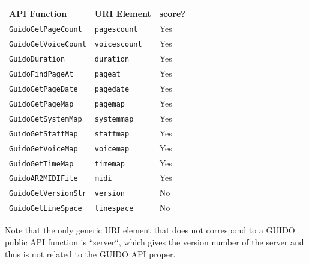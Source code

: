 \documentclass{article}
\begin{document}
\begin{table}
\begin{tabular}{|l|l|l|}\hline
API Function & URI Element & score? \\\hline
\verb=GuidoGetPageCount= & \verb=pagescount= & Yes \\\hline
\verb=GuidoGetVoiceCount= & \verb=voicescount= & Yes \\\hline
\verb=GuidoDuration= & \verb=duration= & Yes \\\hline
\verb=GuidoFindPageAt= & \verb=pageat= & Yes \\\hline
\verb=GuidoGetPageDate= & \verb=pagedate= & Yes \\\hline
\verb=GuidoGetPageMap= & \verb=pagemap= & Yes \\\hline
\verb=GuidoGetSystemMap= & \verb=systemmap= & Yes \\\hline
\verb=GuidoGetStaffMap= & \verb=staffmap= & Yes \\\hline
\verb=GuidoGetVoiceMap= & \verb=voicemap= & Yes \\\hline
\verb=GuidoGetTimeMap= & \verb=timemap= & Yes \\\hline
\verb=GuidoAR2MIDIFile= & \verb=midi= & Yes \\\hline
\verb=GuidoGetVersionStr= & \verb=version= & No \\\hline
\verb=GuidoGetLineSpace= & \verb=linespace= & No \\\hline
\end{tabular}
\end{table}
Note that the only generic URI element that does not correspond to a GUIDO public API function is ``server``, which gives the version number of the server and thus is not related to the GUIDO API proper.
\end{document}
